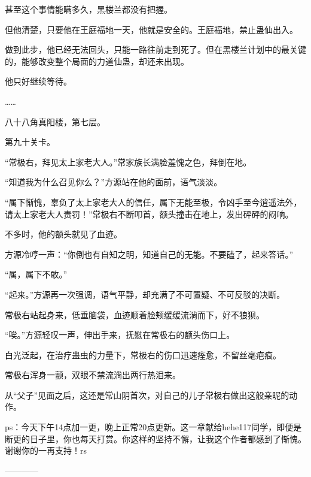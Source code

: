 \begin{this_body}
甚至这个事情能瞒多久，黑楼兰都没有把握。

但他清楚，只要他在王庭福地一天，他就是安全的。王庭福地，禁止蛊仙出入。

做到此步，他已经无法回头，只能一路往前走到死了。但在黑楼兰计划中的最关键的，能够改变整个局面的力道仙蛊，却还未出现。

他只好继续等待。

……

八十八角真阳楼，第七层。

第九十关卡。

“常极右，拜见太上家老大人。”常家族长满脸羞愧之色，拜倒在地。

“知道我为什么召见你么？”方源站在他的面前，语气淡淡。

“属下惭愧，辜负了太上家老大人的信任，属下无能至极，令凶手至今逍遥法外，请太上家老大人责罚！”常极右不断叩首，额头撞击在地上，发出砰砰的闷响。

不多时，他的额头就见了血迹。

方源冷哼一声：“你倒也有自知之明，知道自己的无能。不要磕了，起来答话。”

“属，属下不敢。”

“起来。”方源再一次强调，语气平静，却充满了不可置疑、不可反驳的决断。

常极右站起身来，低垂脑袋，血迹顺着脸颊缓缓流淌而下，好不狼狈。

“唉。”方源轻叹一声，伸出手来，抚慰在常极右的额头伤口上。

白光泛起，在治疗蛊虫的力量下，常极右的伤口迅速痊愈，不留丝毫疤痕。

常极右浑身一颤，双眼不禁流淌出两行热泪来。

从“父子”见面之后，这还是常山阴首次，对自己的儿子常极右做出这般亲昵的动作。

ps：今天下午14点加一更，晚上正常20点更新。这一章献给hehe117同学，即便是断更的日子里，你也每天打赏。你这样的坚持不懈，让我这个作者都感到了惭愧。谢谢你的一再支持！rs

------------

\end{this_body}


